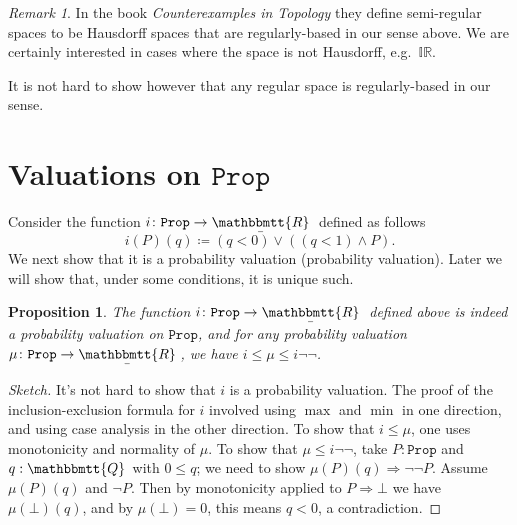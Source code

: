 \documentclass[11pt, oneside, article]{memoir}
\theoremstyle{plain}
\newtheorem{proposition}[theorem]{Proposition}
\theoremstyle{definition}
\theoremstyle{remark}
\newtheorem{remark}[theorem]{Remark}
\newcommand{\const}[1]{\mathtt{#1}}
\newcommand{\ubar}[1]{\underaccent{\bar}{#1}}
\newcommand{\internal}[1]{\raisebox{-.03ex}{$\mathbbmtt{#1}$}}
\newcommand{\hs}{\hspace{1.1pt}}
\newcommand{\IR}{\mathbb{IR}} %
\newcommand{\tQQ}{\internal{Q}\hs}
\newcommand{\tRR}{\internal{R}\hs}
\newcommand{\tLR}{\ubar{\tRR}\hs}
\newcommand{\Prop}{\const{Prop}}
\newcommand{\imp}{\Rightarrow}
\begin{document}
\begin{remark}
In the book \emph{Counterexamples in Topology} they define semi-regular spaces to be Hausdorff spaces that are regularly-based in our sense above. We are certainly interested in cases where the space is not Hausdorff, e.g.\ $\IR$.

It is not hard to show however that any regular space is regularly-based in our sense. 
\end{remark}

\section{Valuations on $\Prop$}

Consider the function $i\colon\Prop\to\tLR$ defined as follows
\[i(P)(q)\coloneqq(q<0)\vee((q<1)\wedge P).\]
We next show that it is a probability valuation (probability valuation). Later we will show that, under some conditions, it is unique such.

\begin{proposition}\label{prop.sandwich}
The function $i\colon\Prop\to\tLR$ defined above is indeed a probability valuation on $\Prop$, and for any probability valuation $\mu\colon\Prop\to\tLR$, we have $i\leq\mu\leq i\neg\neg$.
\end{proposition}
\begin{proof}[Sketch]
It's not hard to show that $i$ is a probability valuation. The proof of the inclusion-exclusion formula for $i$ involved using $\max$ and $\min$ in one direction, and using case analysis in the other direction. To show that $i\leq\mu$, one uses monotonicity and normality of $\mu$. To show that $\mu\leq i\neg\neg$, take $P:\Prop$ and $q:\tQQ$ with $0\leq q$; we need to show $\mu(P)(q)\imp\neg\neg P$. Assume $\mu(P)(q)$ and $\neg P$. Then by monotonicity applied to $P \imp \bot$ we have $\mu(\bot)(q)$, and by $\mu(\bot)=0$, this means $q<0$, a contradiction.
\end{proof}
\end{document}
